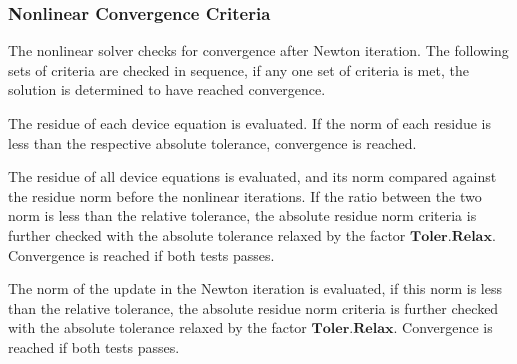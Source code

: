 \documentclass[oneside,12pt]{cgd_book}
\begin{document}
\subsubsection{Nonlinear Convergence Criteria}
The nonlinear solver checks for convergence after Newton iteration. The following sets of criteria are
          checked in sequence, if any one set of criteria is met, the solution is determined to have reached
          convergence.
\par
{}The residue of each device equation is evaluated. If the norm of each residue is less than the
            respective absolute tolerance, convergence is reached.
\par
\par
{}The residue of all device equations is evaluated, and its norm compared against the residue norm
            before the nonlinear iterations. If the ratio between the two norm is less than the relative tolerance, the
            absolute residue norm criteria is further checked with the absolute tolerance relaxed by the factor
$\mathbf{Toler.Relax}$. Convergence is reached if both tests passes.
\par
\par
{}The norm of the update in the Newton iteration is evaluated, if this norm is less than the relative
            tolerance, the absolute residue norm criteria is further checked with the absolute tolerance relaxed by the
            factor $\mathbf{Toler.Relax}$. Convergence is reached if both tests passes.
\par
\par
\end{document}
